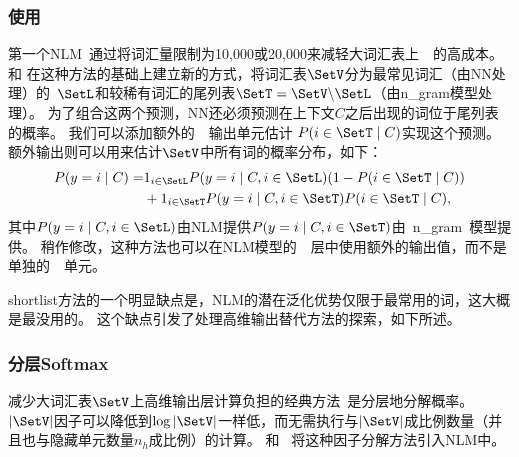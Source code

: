 \subsubsection{使用}
第一个\gls{NLM}~\citep{BenDucVin01-small,Bengio-nnlm2003-small}通过将词汇量限制为10,000或20,000来减轻大词汇表上~~的高成本。
\citet{Schwenk+Gauvain2002}和 \citet{Schwenk-2007}在这种方法的基础上建立新的方式，将词汇表$\SetV$分为最常见词汇（由\gls{NN}处理）的~$\SetL$和较稀有词汇的尾列表$\SetT = \SetV \backslash \SetL$（由\gls{n_gram}模型处理）。
为了组合这两个预测，\gls{NN}还必须预测在上下文$C$之后出现的词位于尾列表的概率。
我们可以添加额外的~~输出单元估计 $P(i \in \SetT \mid C)$实现这个预测。
额外输出则可以用来估计$\SetV$中所有词的概率分布，如下：
\begin{align}
 P(y=i\mid C)  =& 1_{i \in \SetL} P(y=i\mid C, i \in \SetL) (1 - P(i \in \SetT\mid C)) \nonumber \\
     & + 1_{i \in \SetT} P(y=i\mid C, i \in \SetT) P(i \in \SetT\mid C),
\end{align}
其中$P(y=i\mid C, i \in \SetL)$由\gls{NLM}提供$P(y=i\mid C, i \in \SetT)$由~\gls{n_gram}~模型提供。
稍作修改，这种方法也可以在\gls{NLM}模型的~~层中使用额外的输出值，而不是单独的~~单元。

\gls{shortlist}方法的一个明显缺点是，\gls{NLM}的潜在泛化优势仅限于最常用的词，这大概是最没用的。
这个缺点引发了处理高维输出替代方法的探索，如下所述。

\subsubsection{分层Softmax}
减少大词汇表$\SetV$上高维输出层计算负担的经典方法~\citep{Goodman2001}是分层地分解概率。
$|\SetV|$因子可以降低到$\log |\SetV|$一样低，而无需执行与$|\SetV|$成比例数量（并且也与隐藏单元数量$n_h$成比例）的计算。
\citet{BengioTR1215}和~\citet{Morin+Bengio-2005-small} 将这种因子分解方法引入\gls{NLM}中。


